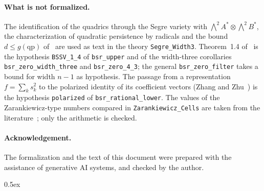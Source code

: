 \documentclass[10pt,a4paper]{article}
\begin{document}
\paragraph{What is not formalized.} The identification of the quadrics through the Segre variety with $\bigwedge^2A^*\otimes\bigwedge^2B^*$, the characterization of quadratic persistence by radicals and the bound $d\le g(\mathrm{qp})$ of~\cite{BSSV} are used as text in the theory \texttt{Segre\_Width3}. Theorem~1.4 of~\cite{BSSV} is the hypothesis \texttt{BSSV\_1\_4} of \texttt{bsr\_upper} and of the width-three corollaries \texttt{bsr\_zero\_width\_three} and \texttt{bsr\_zero\_4\_3}; the general \texttt{bsr\_zero\_filter} takes a bound for width $n-1$ as hypothesis. The passage from a representation $f=\sum_k s_k^2$ to the polarized identity of its coefficient vectors (Zhang and Zhu~\cite[Prop.~2.1]{ZhangZhu}) is the hypothesis \texttt{polarized} of \texttt{bsr\_rational\_lower}. The values of the Zarankiewicz-type numbers compared in \texttt{Zarankiewicz\_Cells} are taken from the literature~\cite{ChenChen}; only the arithmetic is checked.

\paragraph{Acknowledgement.} The formalization and the text of this document were prepared with the
assistance of generative AI systems, and checked by the author.

\tableofcontents

\parindent 0pt\parskip 0.5ex





\end{document}
